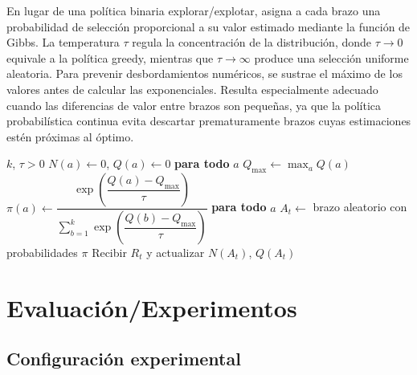 En lugar de una política binaria explorar/explotar, asigna a cada brazo una probabilidad de selección proporcional a su valor estimado mediante la función de Gibbs. La temperatura $\tau$ regula la concentración de la distribución, donde $\tau \to 0$ equivale a la política greedy, mientras que $\tau \to \infty$ produce una selección uniforme aleatoria. Para prevenir desbordamientos numéricos, se sustrae el máximo de los valores antes de calcular las exponenciales. Resulta especialmente adecuado cuando las diferencias de valor entre brazos son pequeñas, ya que la política probabilística continua evita descartar prematuramente brazos cuyas estimaciones estén próximas al óptimo.

\begin{algorithm}
\caption{Softmax (Gibbs)}\label{algo:softmax}
\begin{algorithmic}[1]
\Require $k$, $\tau > 0$
\State $N(a) \gets 0$, $Q(a) \gets 0$ \textbf{para todo} $a$
    \State $Q_{\max} \gets \max_a Q(a)$
    \State $\pi(a) \gets \dfrac{\exp\!\left(\dfrac{Q(a)-Q_{\max}}{\tau}\right)}
                               {\sum_{b=1}^{k}\exp\!\left(\dfrac{Q(b)-Q_{\max}}{\tau}\right)}$
           \textbf{para todo} $a$
    \State $A_t \gets$ brazo aleatorio con probabilidades $\pi$
    \State Recibir $R_t$ y actualizar $N(A_t)$, $Q(A_t)$
\EndFor
\end{algorithmic}
\end{algorithm}

\section{Evaluación/Experimentos}

\subsection*{Configuración experimental}

